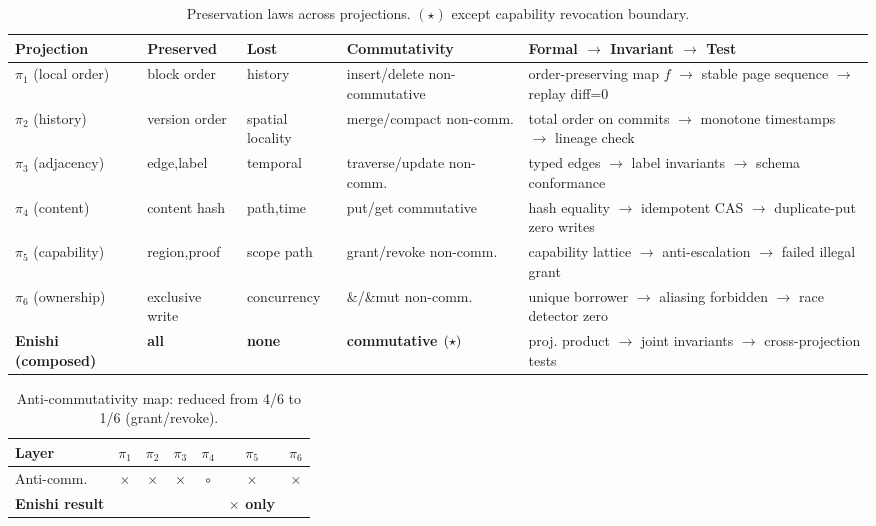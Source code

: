 \documentclass[10pt]{article}
\begin{document}
\begin{table}[h]
\centering
\small
\begin{tabularx}{\linewidth}{l l l l l}
\toprule
Projection & Preserved & Lost & Commutativity & Formal $\to$ Invariant $\to$ Test \\
\midrule
$\pi_1$ (local order) & block order & history & insert/delete non-commutative & order-preserving map $f$ $\to$ stable page sequence $\to$ replay diff=0 \\
$\pi_2$ (history) & version order & spatial locality & merge/compact non-comm. & total order on commits $\to$ monotone timestamps $\to$ lineage check \\
$\pi_3$ (adjacency) & edge,label & temporal & traverse/update non-comm. & typed edges $\to$ label invariants $\to$ schema conformance \\
$\pi_4$ (content) & content hash & path,time & put/get commutative & hash equality $\to$ idempotent CAS $\to$ duplicate-put zero writes \\
$\pi_5$ (capability) & region,proof & scope path & grant/revoke non-comm. & capability lattice $\to$ anti-escalation $\to$ failed illegal grant \\
$\pi_6$ (ownership) & exclusive write & concurrency & \&/\&mut non-comm. & unique borrower $\to$ aliasing forbidden $\to$ race detector zero \\
\textbf{Enishi (composed)} & \textbf{all} & \textbf{none} & \textbf{commutative $\small(\star)$} & proj. product $\to$ joint invariants $\to$ cross-projection tests \\
\bottomrule
\end{tabularx}
\caption{Preservation laws across projections. $(\star)$ except capability revocation boundary.}
\label{tab:preserve}
\end{table}

\begin{table}[h]
\centering
\small
\begin{tabular}{lcccccc}
\toprule
Layer & $\pi_1$ & $\pi_2$ & $\pi_3$ & $\pi_4$ & $\pi_5$ & $\pi_6$ \\
\midrule
Anti-comm. & $\times$ & $\times$ & $\times$ & $\circ$ & $\times$ & $\times$ \\
\textbf{Enishi result} &  &  &  &  & \textbf{$\times$ only} &  \\
\bottomrule
\end{tabular}
\caption{Anti-commutativity map: reduced from 4/6 to 1/6 (grant/revoke).}
\label{tab:anti}
\end{table}
\end{document}
